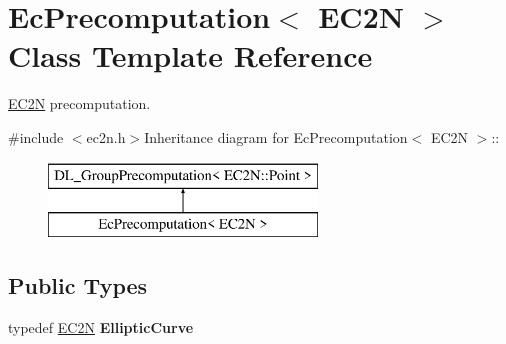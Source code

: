 \hypertarget{class_ec_precomputation_3_01_e_c2_n_01_4}{
\section{EcPrecomputation$<$ EC2N $>$ Class Template Reference}
\label{class_ec_precomputation_3_01_e_c2_n_01_4}
}


\hyperlink{class_e_c2_n}{EC2N} precomputation.  


{\ttfamily \#include $<$ec2n.h$>$}Inheritance diagram for EcPrecomputation$<$ EC2N $>$::\begin{figure}[H]
\begin{center}
\leavevmode
\includegraphics[height=2cm]{class_ec_precomputation_3_01_e_c2_n_01_4}
\end{center}
\end{figure}
\subsection*{Public Types}
\begin{DoxyCompactItemize}
\item 
\hypertarget{class_ec_precomputation_3_01_e_c2_n_01_4_a11cba94e6a64bd6cc9ff2387bb1c72b2}{
typedef \hyperlink{class_e_c2_n}{EC2N} {\bfseries EllipticCurve}}
\label{class_ec_precomputation_3_01_e_c2_n_01_4_a11cba94e6a64bd6cc9ff2387bb1c72b2}

\end{DoxyCompactItemize}
